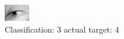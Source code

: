 \begin{figure}[h!]
\begin{center}
\includegraphics[width=0.60\columnwidth]{figures/ID3064_class_3_target_4.png}
\end{center}
\caption{ Classification: 3 actual target: 4}
\label{fig:ID3064_class_3_target_4}
\end{figure}
